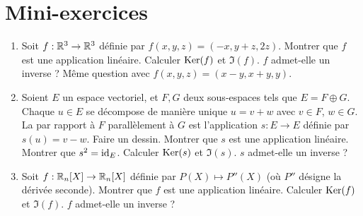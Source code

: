 \section{Mini-exercices}

\begin{frame}

\begin{miniexercice}
\begin{enumerate}
  \item Soit $f : \mathbb{R}^3 \to \mathbb{R}^3$ définie par $f(x,y,z)=(-x,y+z,2z)$.
  Montrer que $f$ est une application linéaire. Calculer $\mathop{\text{Ker}}\nolimits(f)$ et $\Im(f)$.
  $f$ admet-elle un inverse ? Même question avec $f(x,y,z) = (x-y,x+y,y)$.
   
  \item Soient $E$ un espace vectoriel, et $F,G$ deux sous-espaces tels que $E= F \oplus G$.
  Chaque $u\in E$ se décompose de manière unique $u=v+w$ avec $v \in F$, $w\in G$.
  La  par rapport à $F$ parallèlement à $G$ est l'application $s : E \to E$
  définie par $s(u)=v-w$. Faire un dessin. Montrer que $s$ est une application linéaire.
  Montrer que $s^2 = \mathop{\text{id}}\nolimits_E$. Calculer $\mathop{\text{Ker}}\nolimits(s)$ et $\Im(s)$. $s$ admet-elle un inverse ?

  \item Soit $f : \mathbb{R}_n[X] \to \mathbb{R}_n[X]$ définie par $P(X) \mapsto P''(X)$ (où $P''$ désigne la dérivée seconde). 
  Montrer que $f$ est une application linéaire. Calculer $\mathop{\text{Ker}}\nolimits(f)$ et $\Im(f)$. $f$ admet-elle un inverse ?
\end{enumerate}
\end{miniexercice}

\end{frame}

